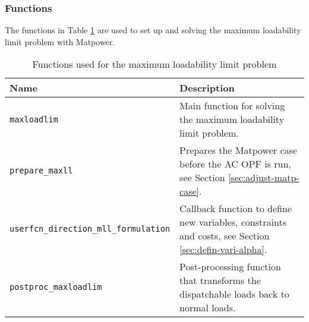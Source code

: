 \documentclass[12pt,a4]{article}
\newcommand*{\codemat}[1]{\texttt{#1}}
\newcommand*{\matpower}{{\sc Matpower}}
\begin{document}
\subsubsection{Functions}
\label{sec:functions}

The functions in Table \ref{tab:functions} are used to set up and solving the maximum loadability limit problem with \matpower{}.

\begin{table}[!h]
  \centering
  \begin{tabular}{lp{8cm}}
  \toprule
  Name  & Description \\
  \midrule
  \codemat{maxloadlim} & Main function for solving the maximum loadability limit problem.\\
  \codemat{prepare\_maxll} & Prepares the \matpower{} case before the AC OPF is run, see Section \ref{sec:adjust-matp-case}.\\
  \codemat{userfcn\_direction\_mll\_formulation} & Callback function to define new variables, constraints and costs, see Section \ref{sec:defin-vari-alpha}. \\
  \codemat{postproc\_maxloadlim} & Post-processing function that transforms the dispatchable loads back to normal loads.\\
  \bottomrule
  \end{tabular}
  \caption{Functions used for the maximum loadability limit problem}
  \label{tab:functions}
\end{table}
\end{document}
